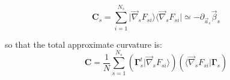 \documentclass[aps,12pt]{revtex4}
\begin{document}
\begin{equation}
	\bm{C}_s = \sum_{i=1}^{N_s} \vert \vec{\nabla}_s F_{si} \rangle  \langle \vec{\nabla}_s F_{si} \vert \simeq -\partial_{\vec{a}_s} \vec{\beta}_s 
\end{equation}

so that the total approximate curvature is:
\begin{equation}
	\bm{C} =  \dfrac{1}{N} \sum_{s=1}^{N_s} \left(  \bm{\Gamma}_s^t \vert \vec{\nabla}_s F_{si} \rangle\right) \left( \langle \vec{\nabla}_s F_{si} \vert \bm{\Gamma}_s\right)
\end{equation}
\end{document}
